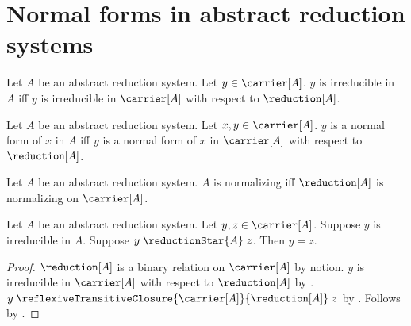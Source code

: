 


\section{Normal forms in abstract reduction systems}

\begin{definition}\label{irreducible_in_reduction_system}
    Let $A$ be an abstract reduction system.
    Let $y\in\carrier[A]$.
    $y$ is irreducible in $A$ iff
        $y$ is irreducible in $\carrier[A]$ with respect to $\reduction[A]$.
\end{definition}

\begin{definition}\label{normal_form_in_reduction_system}
    Let $A$ be an abstract reduction system.
    Let $x,y\in\carrier[A]$.
    $y$ is a normal form of $x$ in $A$ iff
        $y$ is a normal form of $x$ in $\carrier[A]$
            with respect to $\reduction[A]$.
\end{definition}

\begin{definition}\label{normalizing_reduction_system}
    Let $A$ be an abstract reduction system.
    $A$ is normalizing iff
        $\reduction[A]$ is normalizing on $\carrier[A]$.
\end{definition}

\begin{proposition}\label{irreducible_reduction_star_elim}
    Let $A$ be an abstract reduction system.
    Let $y,z\in\carrier[A]$.
    Suppose $y$ is irreducible in $A$.
    Suppose $y\mathrel{\reductionStar{A}}z$.
    Then $y=z$.
\end{proposition}
\begin{proof}
    $\reduction[A]$ is a binary relation on $\carrier[A]$ by notion.
    $y$ is irreducible in $\carrier[A]$ with respect to $\reduction[A]$
        by .
    $y\mathrel{\reflexiveTransitiveClosure{\carrier[A]}{\reduction[A]}}z$
        by .
    Follows by .
\end{proof}
